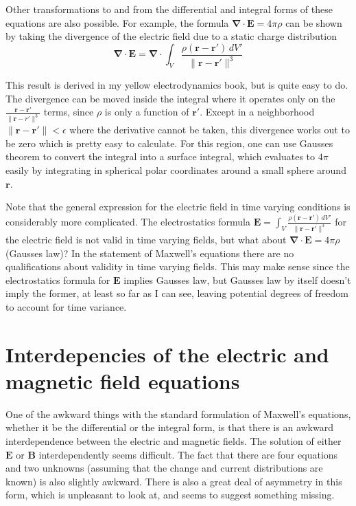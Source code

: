 \documentclass{article}      %
\newcommand{\norm}[1]{\lVert#1\rVert}
\newcommand{\grad}[0]{\boldsymbol{\nabla}}
\newcommand{\diverg}[0]{\grad \cdot}
\newcommand{\BB}[0]{\mathbf{B}}
\newcommand{\BE}[0]{\mathbf{E}}
\begin{document}
Other transformations to and from the differential and integral forms of these
equations are also possible.  For example, the formula $\diverg \BE = 4\pi\rho$ 
can be shown by taking the divergence of the electric field due to a static
charge distribution
\begin{equation*}
\diverg \BE = \diverg \int_V{\frac{\rho (\mathbf{r - r'})\,dV'}{\norm{\mathbf r - \mathbf r'}^3}}
\end{equation*}

This result is derived in my yellow electrodynamics book, but is quite easy to 
do.  The divergence can be moved inside the integral where it operates only on 
the $\frac {\mathbf{r - r'}} {\norm{\mathbf r - r'}^3}$ terms, since $\rho$ is 
only a function of $\mathbf r'$.  
Except in a neighborhood 
$\norm{\mathbf{r - r'}} < \epsilon$
where the derivative cannot be taken,
this divergence works out to be zero which is pretty easy to calculate.
For this region, one can use Gausses theorem to convert the 
integral into a surface integral, which evaluates to $4\pi$ easily by integrating in spherical polar coordinates
around a small sphere around $\mathbf r$.

Note that the general expression for the 
electric field in time varying conditions is considerably more complicated.
The electrostatics formula 
$\BE = \int_V{\frac{\rho (\mathbf{r - r'})\,dV'}{\norm{\mathbf r - \mathbf r'}^3}}$
for the electric field is not valid in time 
varying fields, but what 
about $\diverg \BE = 4\pi\rho$ (Gausses law)?  In the statement of Maxwell's equations
there are no qualifications about validity in time varying fields.  This may
make sense since the electrostatics formula for $\BE$ implies Gausses law, 
but Gausses law by itself doesn't imply the former, at least so far as I can
see, leaving potential 
degrees of freedom to account for time variance.

\section{Interdepencies of the electric and magnetic field equations}

One of the awkward things with the standard formulation of 
Maxwell's equations, whether it be the 
differential or the integral form, is that there 
is an awkward interdependence between the electric and magnetic fields. 
The solution of either $\BE$ or $\BB$ interdependently seems difficult.  The 
fact that there are four equations and two unknowns (assuming that the 
change and current distributions are known) is also slightly awkward.
There is also a great deal of asymmetry in this form, which is unpleasant
to look at, and seems to suggest something missing.
\end{document}
